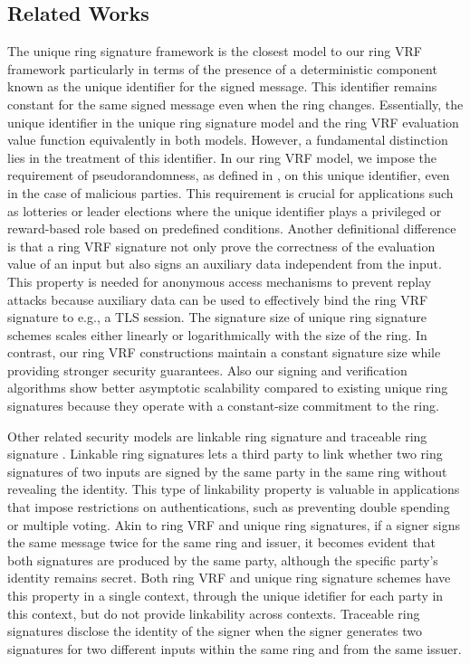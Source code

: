 \subsection{Related Works}


The unique ring signature framework \cite{URCframework} is the closest model to our ring VRF framework particularly in terms of the presence of a deterministic component known as the unique identifier for the signed message. This identifier remains constant for the same signed message even when the ring changes.  Essentially, the unique identifier in the unique ring signature model and the ring VRF evaluation value function equivalently in both models. However, a fundamental distinction lies in the treatment of this identifier. In our ring VRF model, we impose the requirement of pseudorandomness, as defined in \cite{ucvrf,praos}, on this unique identifier, even in the case of malicious parties.
This requirement is crucial for applications such as lotteries or leader elections where the unique identifier plays a privileged or reward-based role based on predefined conditions. Another definitional difference is that a ring VRF  signature not only prove the correctness of the evaluation value of an input but also signs an auxiliary data independent from the input. This property is needed for anonymous access mechanisms to prevent replay attacks because auxiliary data can be used to effectively bind the ring VRF signature to e.g., a TLS session.
The signature size of unique ring signature schemes scales either linearly \cite{URCframework,URCfc} or logarithmically  \cite{URCblockchainprivacy,URClattice} with the size of the ring. In contrast, our ring VRF constructions maintain a constant signature size while providing stronger security guarantees. Also our signing and verification algorithms show better asymptotic scalability compared to existing unique ring signatures because they operate with a constant-size  commitment to the ring.

Other related security models are linkable ring signature \cite{ring_linkable,ring_linkablee} and traceable ring signature \cite{traceable07,traceable_sub}. Linkable ring signatures lets a third party to link whether two ring signatures of two inputs are signed by the same party in the same ring without revealing the identity. This type of linkability property is valuable in applications that impose restrictions on authentications, such as preventing double spending or multiple voting. Akin to ring VRF and unique ring signatures, if a signer signs the same message twice for the same ring and issuer, it becomes evident that both signatures are produced by the same party, although the specific party's identity remains secret. Both ring VRF and unique ring signature schemes have this property in a single context, through the unique idetifier for each party in this context, but do not provide linkability across contexts.
 Traceable ring signatures disclose the identity of the signer when the signer generates two signatures for two different inputs within the same ring and from the same issuer.

